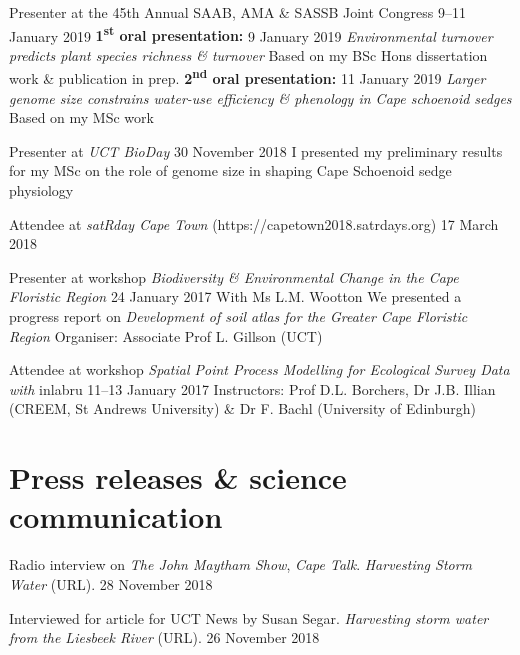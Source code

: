 \documentclass[10pt]{article}
\begin{document}
\begin{hangparas}{2em}{1}

Presenter at the 45th Annual SAAB, AMA \& SASSB Joint Congress
                                       \hfill {\small 9--11 January 2019} \break
\textbf{1\textsuperscript{st} oral presentation:}
                                           \hfill {\small 9 January 2019} \break
\textit{Environmental turnover predicts plant species richness \& turnover}
\break
Based on my BSc Hons dissertation work \& publication in prep. \break
\textbf{2\textsuperscript{nd} oral presentation:}
                                          \hfill {\small 11 January 2019} \break
\textit{Larger genome size constrains water-use efficiency \& phenology in 
Cape schoenoid sedges} \break
Based on my MSc work

Presenter at \textit{UCT BioDay}         \hfill {\small 30 November 2018} \break
I presented my preliminary results for my MSc on the role of genome size in 
shaping Cape Schoenoid sedge physiology

Attendee at \textit{satRday Cape Town} (https://capetown2018.satrdays.org)
                                                   \hfill {\small 17 March 2018}

Presenter at workshop \textit{Biodiversity \& Environmental Change in the Cape 
Floristic Region}                         \hfill {\small 24 January 2017} \break
With Ms L.M. Wootton \break
We presented a progress report on \textit{Development of soil atlas for the 
Greater Cape Floristic Region} \break
Organiser: Associate Prof L. Gillson (UCT)

Attendee at workshop \textit{Spatial Point Process Modelling for Ecological 
Survey Data with} inlabru             \hfill {\small 11--13 January 2017} \break
Instructors: Prof D.L. Borchers, Dr J.B. Illian (CREEM, St Andrews University) 
\& Dr F. Bachl (University of Edinburgh)

\hfill

\end{hangparas}

\section*{Press releases \& science communication} %

Radio interview on \textit{The John Maytham Show}, \textit{Cape Talk}.
\textit{Harvesting Storm Water} (URL).                   \hfill 28 November 2018

Interviewed for article for UCT News by Susan Segar. \textit{Harvesting storm 
water from the Liesbeek River} (URL).                    \hfill 26 November 2018
\end{document}
